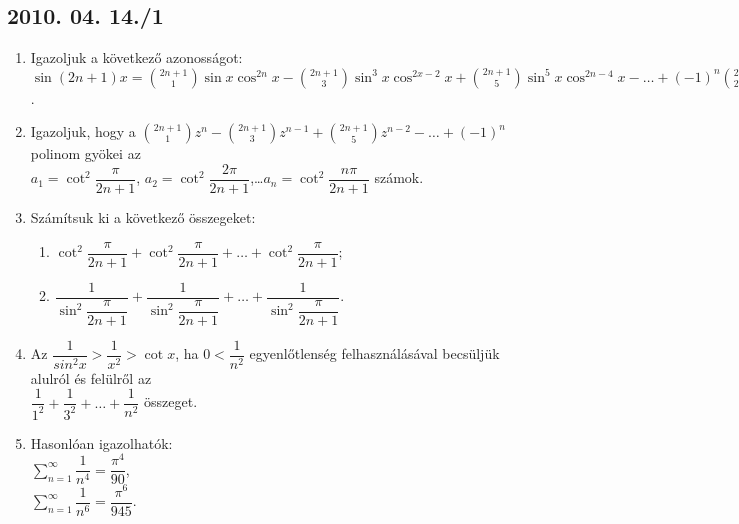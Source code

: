 \documentclass{article}
\newenvironment{abc}{\begin{enumerate}[label=\textit{\alph*})]}{\end{enumerate}}
\begin{document}
\subsection*{2010. 04. 14./1}
\begin{enumerate}
\item Igazoljuk a következő azonosságot:\\
$\sin(2n+1)x=\binom{2n+1}{1}\sin x\cos^{2n} x-\binom{2n+1}{3}\sin^3 x\cos^{2x-2} x+\binom{2n+1}{5}\sin^5 x \cos^{2n-4} x-\ldots+(-1)^n\binom{2n+1}{2n+1}\sin^{2n+1}x$.
\item Igazoljuk, hogy a $\binom{2n+1}{1}z^n-\binom{2n+1}{3}z^{n-1}+\binom{2n+1}{5}z^{n-2}-\ldots+(-1)^n$ polinom gyökei az \\
$a_1=\cot^2\dfrac{\pi}{2n+1}$, $a_2=\cot^2\dfrac{2\pi}{2n+1}$,\ldots $a_n=\cot^2\dfrac{n\pi}{2n+1}$ számok.
\item Számítsuk ki a következő összegeket:
	\begin{abc}
    \item $\cot^2\dfrac{\pi}{2n+1}+\cot^2\dfrac{\pi}{2n+1}+\ldots+\cot^2\dfrac{\pi}{2n+1}$;
     \item $\dfrac{1}{\sin^2\dfrac{\pi}{2n+1}}+\dfrac{1}{\sin^2\dfrac{\pi}{2n+1}}+\ldots+\dfrac{1}{\sin^2\dfrac{\pi}{2n+1}}$.
	\end{abc}
\item Az $\dfrac{1}{sin^2 x}>\dfrac{1}{x^2}>\cot x$, ha $0<\dfrac{1}{n^2}$ egyenlőtlenség felhasználásával becsüljük alulról és felülről az\\
$\dfrac{1}{1^2}+\dfrac{1}{3^2}+\ldots+\dfrac{1}{n^2}$ összeget.\\
\item Hasonlóan igazolhatók:\\
$\displaystyle\sum_{n=1}^{\infty}\dfrac{1}{n^4}=\dfrac{\pi^4}{90}$,\\
$\displaystyle\sum_{n=1}^{\infty}\dfrac{1}{n^6}=\dfrac{\pi^6}{945}$.

\end{enumerate}
\end{document}
